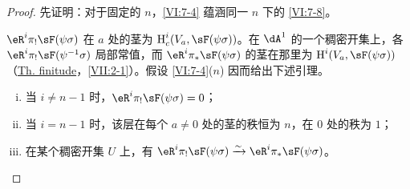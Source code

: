 \begin{proof}
先证明：对于固定的 $n$，\ref{VI:7-4} 蕴涵同一 $n$ 下的 \ref{VI:7-8}。

$\eR^i\pi_!\sF(\psi\sigma)$ 在 $a$ 处的茎为 $\h_c^i(V_a,\sF(\psi\sigma))$。在 $\dA^1$ 的一个稠密开集上，各 $\eR^i\pi_!\sF(\psi^{-1}\sigma)$ 局部常值，而 $\eR^i\pi_\ast\sF(\psi\sigma)$ 的茎在那里为 $\h^i(V_a,\sF(\psi\sigma))$（\hyperref[VII]{Th. finitude}，\ref{VII:2-1}）。假设 \ref{VI:7-4}($n$) 因而给出下述引理。

\begin{lemma_}\label{VI:7-9}
\begin{enumerate}[(i)]
\item 当 $i\ne n-1$ 时，$\eR^i\pi_!\sF(\psi\sigma)=0$；
\item 当 $i=n-1$ 时，该层在每个 $a\ne0$ 处的茎的秩恒为 $n$，在 $0$ 处的秩为 $1$；
\item 在某个稠密开集 $U$ 上，有
$\eR^i\pi_!\sF(\psi\sigma)\iso\eR^i\pi_\ast\sF(\psi\sigma)$。
\end{enumerate}
\end{lemma_}


\end{proof}
